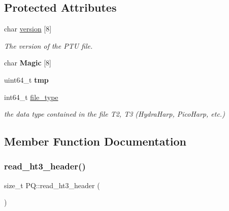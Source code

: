 \subsection*{Protected Attributes}
\begin{DoxyCompactItemize}
\item 
\mbox{\label{class_p_q_a6a8835159fddcd5a32834a5d2bf41e0c}} 
char \hyperlink{class_p_q_a6a8835159fddcd5a32834a5d2bf41e0c}{version} \mbox{[}8\mbox{]}
\begin{DoxyCompactList}\small\item\em The version of the P\+TU file. \end{DoxyCompactList}\item 
\mbox{\label{class_p_q_a2f8151f3f43c5b65e90424275ee10d76}} 
char {\bfseries Magic} \mbox{[}8\mbox{]}
\item 
\mbox{\label{class_p_q_ab3c7f1c35e4eb25ab953795427fe9a48}} 
uint64\+\_\+t {\bfseries tmp}
\item 
\mbox{\label{class_p_q_a0bf8599535f2ef851cd77c96c7c6b07c}} 
int64\+\_\+t \hyperlink{class_p_q_a0bf8599535f2ef851cd77c96c7c6b07c}{file\+\_\+type}
\begin{DoxyCompactList}\small\item\em the data type contained in the file T2, T3 (Hydra\+Harp, Pico\+Harp, etc.) \end{DoxyCompactList}\end{DoxyCompactItemize}


\subsection{Member Function Documentation}
\mbox{\label{class_p_q_a50f84ba3ab4e1707367cde3c10476c3f}} 
\subsubsection{\texorpdfstring{read\+\_\+ht3\+\_\+header()}{read\_ht3\_header()}}
{\footnotesize\ttfamily size\+\_\+t P\+Q\+::read\+\_\+ht3\+\_\+header (\begin{DoxyParamCaption}{ }\end{DoxyParamCaption})\hspace{0.3cm}{\ttfamily [protected]}}

